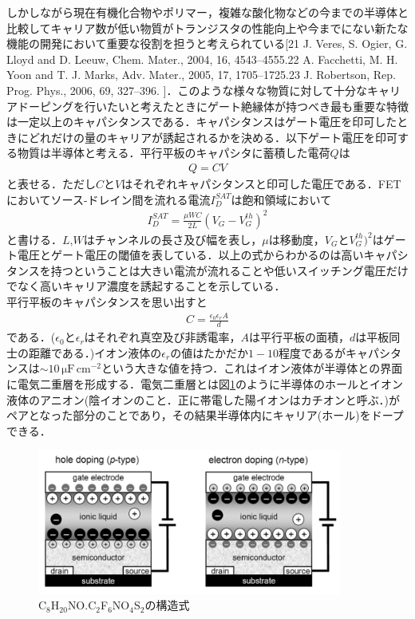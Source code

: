 しかしながら現在有機化合物やポリマー，複雑な酸化物などの今までの半導体と比較してキャリア数が低い物質がトランジスタの性能向上や今までにない新たな機能の開発において重要な役割を担うと考えられている[21 J. Veres, S. Ogier, G. Lloyd and D. Leeuw, Chem. Mater., 2004, 16, 4543–4555.22 A. Facchetti, M. H. Yoon and T. J. Marks, Adv. Mater., 2005, 17, 1705–1725.23 J. Robertson, Rep. Prog. Phys., 2006, 69, 327–396. ]．このような様々な物質に対して十分なキャリアドーピングを行いたいと考えたときにゲート絶縁体が持つべき最も重要な特徴は一定以上のキャパシタンスである．キャパシタンスはゲート電圧を印可したときにどれだけの量のキャリアが誘起されるかを決める．以下ゲート電圧を印可する物質は半導体と考える．平行平板のキャパシタに蓄積した電荷$Q$は
\begin{eqnarray}
Q = CV
\label{eq:capaq}
\end{eqnarray}
と表せる．ただし$C$と$V$はそれぞれキャパシタンスと印可した電圧である．FETにおいてソース-ドレイン間を流れる電流$I_{D}^{SAT}$は飽和領域において
\begin{eqnarray}
I_{D}^{SAT} = \frac{\mu W C}{2L}(V_{G}-V_{G}^{th})^{2}
\label{eq:id}
\end{eqnarray}
と書ける．$L$,$W$はチャンネルの長さ及び幅を表し，$\mu$は移動度，$V_{G}$と$V_{G}^{th})^{2}$はゲート電圧とゲート電圧の閾値を表している．以上の式からわかるのは高いキャパシタンスを持つということは大きい電流が流れることや低いスイッチング電圧だけでなく高いキャリア濃度を誘起することを示している．\\
平行平板のキャパシタンスを思い出すと
\begin{eqnarray}
C = \frac{\epsilon_{0}\epsilon_{r}A}{d}
\label{eq:capa}
\end{eqnarray}
である．($\epsilon_{0}$と$\epsilon_{r}$はそれぞれ真空及び非誘電率，$A$は平行平板の面積，$d$は平板同士の距離である．)イオン液体の$\epsilon_{r}$の値はたかだか$1-10$程度であるがキャパシタンスは$\sim10\,\mathrm{\mu F\,cm^{-2}}$という大きな値を持つ．これはイオン液体が半導体との界面に電気二重層を形成する．電気二重層とは図\ref{EDL}のように半導体のホールとイオン液体のアニオン(陰イオンのこと．正に帯電した陽イオンはカチオンと呼ぶ．)がペアとなった部分のことであり，その結果半導体内にキャリア(ホール)をドープできる．
\begin{figure}[t]
 \begin{center}
  \includegraphics[width=100mm]{images/EDl.png}
\end{center}
 \caption{C$_{8}$H$_{20}$NO.C$_{2}$F$_{6}$NO$_{4}$S$_{2}$の構造式}
 \label{EDL}
\end{figure}

